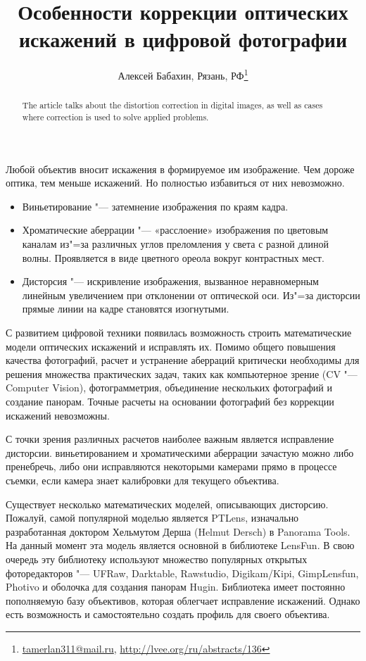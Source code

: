 \documentclass[10pt, a5paper]{article}
\begin{document}
\title{Особенности коррекции оптических искажений в цифровой фотографии}
\author{Алексей Бабахин, Рязань, РФ\footnote{\url{tamerlan311@mail.ru}, \url{http://lvee.org/ru/abstracts/136}}}
\maketitle
\begin{abstract}
The article talks about the distortion correction in digital images, as well as cases where correction is used to solve applied problems.
\end{abstract}
Любой объектив вносит искажения в формируемое им изображение. Чем дороже оптика, тем меньше искажений. Но полностью избавиться от них невозможно.

\begin{itemize}
  \item Виньетирование "--- затемнение изображения по краям кадра.
  \item Хроматические аберрации "--- «расслоение» изображения по цветовым каналам из"=за различных углов преломления у света с разной длиной волны. Проявляется в виде цветного ореола вокруг контрастных мест.
  \item Дисторсия "--- искривление изображения, вызванное неравномерным линейным увеличением при отклонении от оптической оси. Из"=за дисторсии прямые линии на кадре становятся изогнутыми.
\end{itemize}

С развитием цифровой техники появилась возможность строить математические модели оптических искажений и исправлять их. Помимо общего повышения качества фотографий, расчет и устранение аберраций критически необходимы для решения множества практических задач, таких как компьютерное зрение (CV "--- Compu\-ter Vision), фотограмметрия, объединение нескольких фотографий и создание панорам. Точные расчеты на основании фотографий без коррекции искажений невозможны.

С точки зрения различных расчетов наиболее важным является исправление дисторсии. виньетированием и хроматическими аберрации зачастую можно либо пренебречь, либо они исправляются некоторыми камерами прямо в процессе съемки, если камера знает калибровки для текущего объектива.

Существует несколько математических моделей, описывающих дисторсию. Пожалуй, самой популярной моделью является PTLens, изначально разработанная доктором Хельмутом Дерша (Helmut \linebreak Dersch) в Panorama Tools. На данный момент эта модель является основной в библиотеке LensFun. В свою очередь эту библиотеку используют множество популярных открытых фоторедакторов "--- UFRaw, Darktable, Rawstudio, Digikam/Kipi, GimpLensfun, Photivo и оболочка для создания панорам Hugin. Библиотека имеет постоянно пополняемую базу объективов, которая облегчает исправление искажений. Однако есть возможность и самостоятельно создать профиль для своего объектива.
\end{document}
